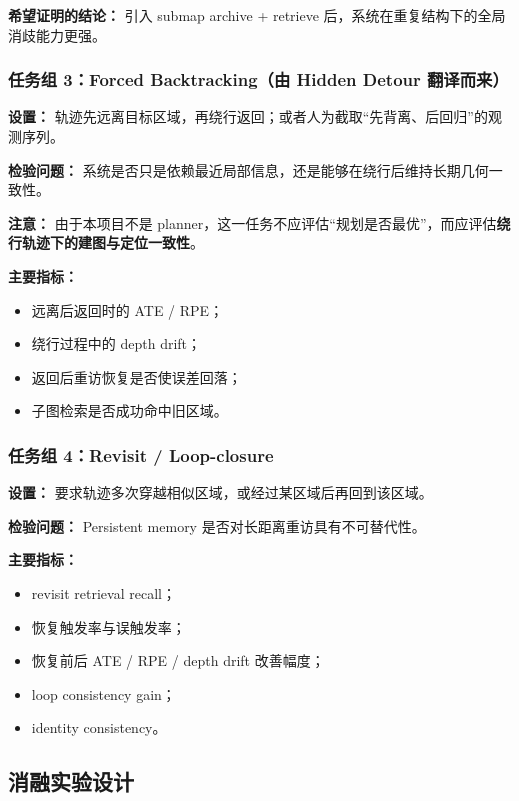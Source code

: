 \documentclass[12pt]{article}
\begin{document}
\textbf{希望证明的结论：}
引入 submap archive + retrieve 后，系统在重复结构下的全局消歧能力更强。

\subsubsection{任务组 3：Forced Backtracking（由 Hidden Detour 翻译而来）}

\textbf{设置：}
轨迹先远离目标区域，再绕行返回；或者人为截取“先背离、后回归”的观测序列。

\textbf{检验问题：}
系统是否只是依赖最近局部信息，还是能够在绕行后维持长期几何一致性。

\textbf{注意：}
由于本项目不是 planner，这一任务不应评估“规划是否最优”，而应评估\textbf{绕行轨迹下的建图与定位一致性}。

\textbf{主要指标：}
\begin{itemize}
  \item 远离后返回时的 ATE / RPE；
  \item 绕行过程中的 depth drift；
  \item 返回后重访恢复是否使误差回落；
  \item 子图检索是否成功命中旧区域。
\end{itemize}

\subsubsection{任务组 4：Revisit / Loop-closure}

\textbf{设置：}
要求轨迹多次穿越相似区域，或经过某区域后再回到该区域。

\textbf{检验问题：}
Persistent memory 是否对长距离重访具有不可替代性。

\textbf{主要指标：}
\begin{itemize}
  \item revisit retrieval recall；
  \item 恢复触发率与误触发率；
  \item 恢复前后 ATE / RPE / depth drift 改善幅度；
  \item loop consistency gain；
  \item identity consistency。
\end{itemize}

\subsection{消融实验设计}
\end{document}
